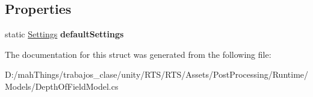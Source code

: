 \subsection*{Properties}
\begin{DoxyCompactItemize}
\item 
\mbox{\label{struct_unity_engine_1_1_post_processing_1_1_depth_of_field_model_1_1_settings_a33cabc314b2e0327ed8a4927d61d4feb}} 
static \mbox{\hyperlink{struct_unity_engine_1_1_post_processing_1_1_depth_of_field_model_1_1_settings}{Settings}} {\bfseries default\+Settings}
\end{DoxyCompactItemize}


The documentation for this struct was generated from the following file\+:\begin{DoxyCompactItemize}
\item 
D\+:/mah\+Things/trabajos\+\_\+clase/unity/\+R\+T\+S/\+R\+T\+S/\+Assets/\+Post\+Processing/\+Runtime/\+Models/Depth\+Of\+Field\+Model.\+cs\end{DoxyCompactItemize}
